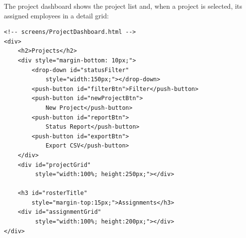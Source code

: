 The project dashboard shows the project list and, when a project is selected, its assigned employees in a detail grid:

\begin{lstlisting}[style=html]
<!-- screens/ProjectDashboard.html -->
<div>
    <h2>Projects</h2>
    <div style="margin-bottom: 10px;">
        <drop-down id="statusFilter"
            style="width:150px;"></drop-down>
        <push-button id="filterBtn">Filter</push-button>
        <push-button id="newProjectBtn">
            New Project</push-button>
        <push-button id="reportBtn">
            Status Report</push-button>
        <push-button id="exportBtn">
            Export CSV</push-button>
    </div>
    <div id="projectGrid"
         style="width:100%; height:250px;"></div>

    <h3 id="rosterTitle"
        style="margin-top:15px;">Assignments</h3>
    <div id="assignmentGrid"
         style="width:100%; height:200px;"></div>
</div>
\end{lstlisting}


